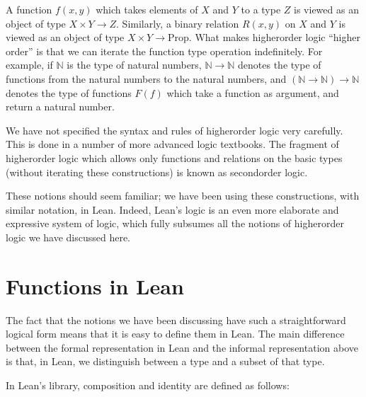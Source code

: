 \documentclass[letterpaper,10pt,english]{sphinxmanual}
\begin{document}
\sphinxAtStartPar
A function \(f(x, y)\) which takes elements of \(X\) and \(Y\) to a type \(Z\) is viewed as an object of type \(X \times Y \to Z\). Similarly, a binary relation \(R(x,y)\) on \(X\) and \(Y\) is viewed as an object of type \(X \times Y \to \mathrm{Prop}\). What makes higher\sphinxhyphen{}order logic “higher order” is that we can iterate the function type operation indefinitely. For example, if \(\mathbb{N}\) is the type of natural numbers, \(\mathbb{N} \to \mathbb{N}\) denotes the type of functions from the natural numbers to the natural numbers, and \((\mathbb{N} \to \mathbb{N}) \to \mathbb{N}\) denotes the type of functions \(F(f)\) which take a function as argument, and return a natural number.

\sphinxAtStartPar
We have not specified the syntax and rules of higher\sphinxhyphen{}order logic very carefully. This is done in a number of more advanced logic textbooks. The fragment of higher\sphinxhyphen{}order logic which allows only functions and relations on the basic types (without iterating these constructions) is known as second\sphinxhyphen{}order logic.

\sphinxAtStartPar
These notions should seem familiar; we have been using these constructions, with similar notation, in Lean. Indeed, Lean’s logic is an even more elaborate and expressive system of logic, which fully subsumes all the notions of higher\sphinxhyphen{}order logic we have discussed here.


\section{Functions in Lean}
\label{\detokenize{functions_in_lean:id1}}
\sphinxAtStartPar
The fact that the notions we have been discussing have such a straightforward logical form means that it is easy to define them in Lean. The main difference between the formal representation in Lean and the informal representation above is that, in Lean, we distinguish between a type  and a subset
 of that type.

\sphinxAtStartPar
In Lean’s library, composition and identity are defined as follows:
\end{document}
